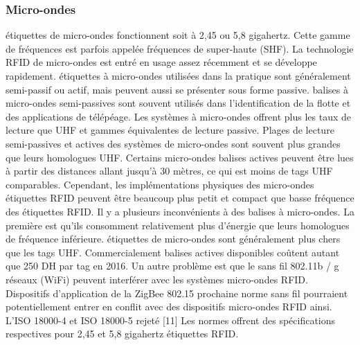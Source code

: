 \documentclass[11pt, a4paper, twoside]{book}
\begin{document}
\subsubsection{Micro-ondes} 
étiquettes de micro-ondes fonctionnent soit à 2,45 ou 5,8 gigahertz. Cette gamme de fréquences est parfois appelée fréquences de super-haute (SHF). La technologie RFID de micro-ondes est entré en usage assez récemment et se développe rapidement. étiquettes à micro-ondes utilisées dans la pratique sont généralement semi-passif ou actif, mais peuvent aussi se présenter sous forme passive. balises à micro-ondes semi-passives sont souvent utilisés dans l'identification de la flotte et des applications de télépéage.
Les systèmes à micro-ondes offrent plus les taux de lecture que UHF et gammes équivalentes de lecture passive. Plages de lecture semi-passives et actives des systèmes de micro-ondes sont souvent plus grandes que leurs homologues UHF. Certains micro-ondes balises actives peuvent être lues à partir des distances allant jusqu'à 30 mètres, ce qui est moins de tags UHF comparables. Cependant, les implémentations physiques des micro-ondes étiquettes RFID peuvent être beaucoup plus petit et compact que basse fréquence des étiquettes RFID.
Il y a plusieurs inconvénients à des balises à micro-ondes. La première est qu'ils consomment relativement plus d'énergie que leurs homologues de fréquence inférieure. étiquettes de micro-ondes sont généralement plus chers que les tags UHF. Commercialement balises actives disponibles coûtent autant que 250 DH par tag en 2016.
Un autre problème est que le sans fil 802.11b / g réseaux (WiFi) peuvent interférer avec les systèmes micro-ondes RFID. Dispositifs d'application de la ZigBee 802.15 prochaine norme sans fil pourraient potentiellement entrer en conflit avec des dispositifs micro-ondes RFID ainsi.
L'ISO 18000-4 et ISO 18000-5 rejeté [11] Les normes offrent des spécifications respectives pour 2,45 et 5,8 gigahertz étiquettes RFID.
\end{document}

